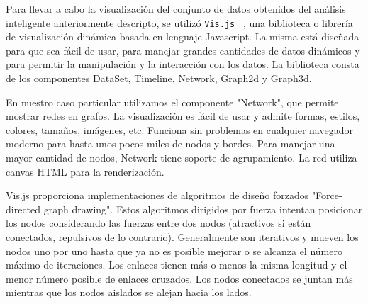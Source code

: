 Para llevar a cabo la visualización del conjunto de datos obtenidos del análisis inteligente anteriormente descripto, se utilizó \texttt{Vis.js} ~\cite{visjsPaginaWeb}, una biblioteca o librería de visualización dinámica basada en lenguaje Javascript. 
La misma está diseñada para que sea fácil de usar, para manejar grandes cantidades de datos dinámicos y para permitir la manipulación y la interacción con los datos. La biblioteca consta de los componentes DataSet, Timeline, Network, Graph2d y Graph3d.

En nuestro caso particular utilizamos el componente "Network", que permite mostrar redes en grafos. La visualización es fácil de usar y admite formas, estilos, colores, tamaños, imágenes, etc. Funciona sin problemas en cualquier navegador moderno para hasta unos pocos miles de nodos y bordes. Para manejar una mayor cantidad de nodos, Network tiene soporte de agrupamiento. La red utiliza canvas HTML para la renderización.

Vis.js proporciona implementaciones de algoritmos de diseño forzados "Force-directed graph drawing". Estos algoritmos dirigidos por fuerza intentan posicionar los nodos considerando las fuerzas entre dos nodos (atractivos si están conectados, repulsivos de lo contrario). Generalmente son iterativos y mueven los nodos uno por uno hasta que ya no es posible mejorar o se alcanza el número máximo de iteraciones. Los enlaces tienen más o menos la misma longitud y el menor número posible de enlaces cruzados. Los nodos conectados se juntan más mientras que los nodos aislados se alejan hacia los lados.

